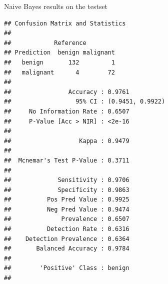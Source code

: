 \documentclass[12pt,ignorenonframetext,]{beamer}
\newenvironment{Shaded}{\begin{snugshade}}{\end{snugshade}}
\newcommand{\CommentTok}[1]{\textcolor[rgb]{0.56,0.35,0.01}{\textit{#1}}}
\newcommand{\DataTypeTok}[1]{\textcolor[rgb]{0.13,0.29,0.53}{#1}}
\newcommand{\KeywordTok}[1]{\textcolor[rgb]{0.13,0.29,0.53}{\textbf{#1}}}
\newcommand{\NormalTok}[1]{#1}
\newcommand{\OperatorTok}[1]{\textcolor[rgb]{0.81,0.36,0.00}{\textbf{#1}}}
\newcommand{\StringTok}[1]{\textcolor[rgb]{0.31,0.60,0.02}{#1}}
\begin{document}
\begin{frame}[fragile]{Naive Bayes results on the testset}
\protect\hypertarget{naive-bayes-results-on-the-testset}{}

\tiny

\begin{Shaded}
\end{Shaded}

\begin{verbatim}
## Confusion Matrix and Statistics
## 
##            Reference
## Prediction  benign malignant
##   benign       132         1
##   malignant      4        72
##                                           
##                Accuracy : 0.9761          
##                  95% CI : (0.9451, 0.9922)
##     No Information Rate : 0.6507          
##     P-Value [Acc > NIR] : <2e-16          
##                                           
##                   Kappa : 0.9479          
##                                           
##  Mcnemar's Test P-Value : 0.3711          
##                                           
##             Sensitivity : 0.9706          
##             Specificity : 0.9863          
##          Pos Pred Value : 0.9925          
##          Neg Pred Value : 0.9474          
##              Prevalence : 0.6507          
##          Detection Rate : 0.6316          
##    Detection Prevalence : 0.6364          
##       Balanced Accuracy : 0.9784          
##                                           
##        'Positive' Class : benign          
## 
\end{verbatim}

\normalsize

\end{frame}
\end{document}

